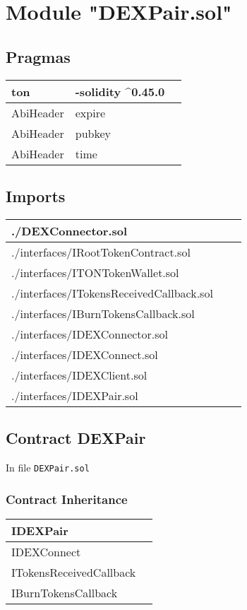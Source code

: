 
\section{Module "DEXPair.sol"}


\subsection{Pragmas}


\noindent\begin{tabular}{|l|l|p{5cm}|}\hline
ton & -solidity \^{}0.45.0 &\\\hline
AbiHeader &  expire &\\\hline
AbiHeader &  pubkey &\\\hline
AbiHeader &  time &\\\hline
\end{tabular}


\subsection{Imports}


\noindent\begin{tabular}{|l|l|p{5cm}|}\hline
./DEXConnector.sol &\\\hline
./interfaces/IRootTokenContract.sol &\\\hline
./interfaces/ITONTokenWallet.sol &\\\hline
./interfaces/ITokensReceivedCallback.sol &\\\hline
./interfaces/IBurnTokensCallback.sol &\\\hline
./interfaces/IDEXConnector.sol &\\\hline
./interfaces/IDEXConnect.sol &\\\hline
./interfaces/IDEXClient.sol &\\\hline
./interfaces/IDEXPair.sol &\\\hline
\end{tabular}


\subsection{Contract DEXPair}


In file {\tt DEXPair.sol}

\subsubsection{Contract Inheritance}


\noindent\begin{tabular}{|l|p{5cm}|}\hline
IDEXPair & \\\hline
IDEXConnect & \\\hline
ITokensReceivedCallback & \\\hline
IBurnTokensCallback & \\\hline
\end{tabular}


